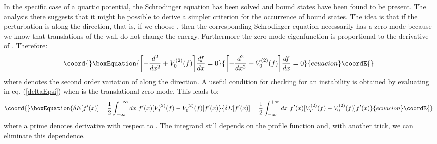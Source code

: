 \documentclass[a4paper,prd,nofootinbib,twocolumn,showpacs]{revtex4}
\begin{document}
In the specific case of a quartic potential, the Schrodinger 
equation has been solved \cite{PogVac00b,PogVac01} 
and bound states have been found to be present. The analysis
there suggests that it might be possible to derive a simpler
criterion for the occurrence of bound states. The idea is that
if the perturbation is along the \coordHE{} direction, that is,
if we choose \coordHE{}, then the corresponding Schrodinger equation
necessarily has a zero mode because we know that translations 
of the wall do not change the energy. Furthermore the zero
mode eigenfunction is proportional to the derivative of \coordHE{}. 
Therefore:
\begin{equation}\coord{}\boxEquation{
 \biggl [ - {{d^2}\over {dx^2}} + V_0^{(2)} (f) \biggr ] 
           {{df}\over {dx}} = 0
\label{schrodinger0}
}{
 \biggl [ - {{d^2}\over {dx^2}} + V_0^{(2)} (f) \biggr ] 
           {{df}\over {dx}} = 0
}{ecuacion}\coordE{}\end{equation}
where \coordHE{} denotes the second order variation of
\coordHE{} along the \coordHE{} direction. A useful condition for
checking for an instability is obtained by evaluating 
\coordHE{} in eq. (\ref{deltaEpsi}) when \myHighlight{$\psi$}\coordHE{} is the translational 
zero mode. This leads to:
\begin{equation}\coord{}\boxEquation{
\delta E [ f'(x) ] = 
 {1\over 2} \int_{-\infty}^{+\infty} dx ~ f'(x) 
                   [ V_T^{(2)} (f) - V_0^{(2)} (f) ] f'(x)
\label{deltaEfprime}
}{
\delta E [ f'(x) ] = 
 {1\over 2} \int_{-\infty}^{+\infty} dx ~ f'(x) 
                   [ V_T^{(2)} (f) - V_0^{(2)} (f) ] f'(x)
}{ecuacion}\coordE{}\end{equation}
where a prime denotes derivative with respect to \coordHE{}. The
integrand still depends on the profile function and, with
another trick, we can eliminate this dependence.
\end{document}

